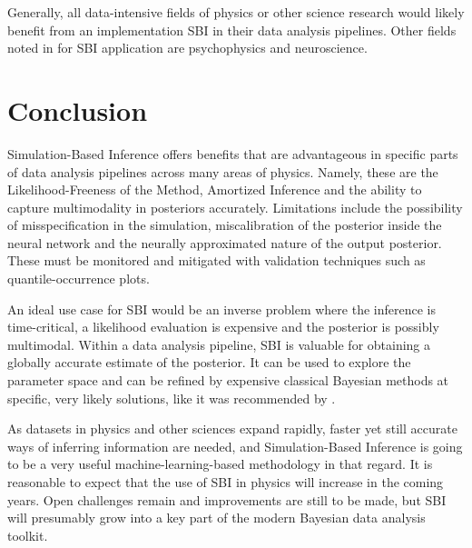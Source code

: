 Generally, all data-intensive fields of physics or other science research would likely benefit from an implementation SBI in their data analysis pipelines.
Other fields noted in \cite{sbi-guide} for SBI application are psychophysics and neuroscience.


\section{Conclusion}%
\label{sec:conclusion}

Simulation-Based Inference offers benefits that are advantageous in specific parts of data analysis pipelines across many areas of physics.
Namely, these are the Likelihood-Freeness of the Method, Amortized Inference and the ability to capture multimodality in posteriors accurately.
Limitations include the possibility of misspecification in the simulation, miscalibration of the posterior inside the neural network and the neurally approximated nature of the output posterior.
These must be monitored and mitigated with validation techniques such as quantile-occurrence plots.

An ideal use case for SBI would be an inverse problem where the inference is time-critical, a likelihood evaluation is expensive and the posterior is possibly multimodal.
Within a data analysis pipeline, SBI is valuable for obtaining a globally accurate estimate of the posterior. 
It can be used to explore the parameter space and can be refined by expensive classical Bayesian methods at specific, very likely solutions, like it was recommended by \cite{microlensing-sbi}.

As datasets in physics and other sciences expand rapidly, faster yet still accurate ways of inferring information are needed, and Simulation-Based Inference is going to be a very useful machine-learning-based methodology in that regard.
It is reasonable to expect that the use of SBI in physics will increase in the coming years.
Open challenges remain and improvements are still to be made, but SBI will presumably grow into a key part of the modern Bayesian data analysis toolkit.

